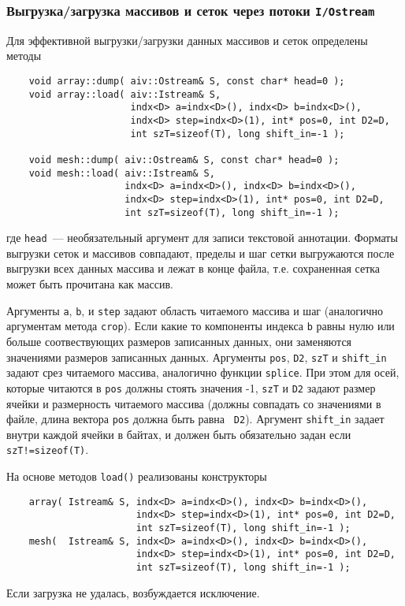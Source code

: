 \subsubsection{Выгрузка/загрузка массивов и сеток через потоки {\tt I/Ostream}}
Для эффективной выгрузки/загрузки данных массивов и сеток определены методы 
\begin{verbatim}
    void array::dump( aiv::Ostream& S, const char* head=0 );
    void array::load( aiv::Istream& S, 
                      indx<D> a=indx<D>(), indx<D> b=indx<D>(), 
                      indx<D> step=indx<D>(1), int* pos=0, int D2=D, 
                      int szT=sizeof(T), long shift_in=-1 );

    void mesh::dump( aiv::Ostream& S, const char* head=0 );
    void mesh::load( aiv::Istream& S, 
                     indx<D> a=indx<D>(), indx<D> b=indx<D>(), 
                     indx<D> step=indx<D>(1), int* pos=0, int D2=D,
                     int szT=sizeof(T), long shift_in=-1 );
\end{verbatim}
где {\tt head}~--- необязательный аргумент для записи текстовой
аннотации. Форматы выгрузки сеток и массивов совпадают, пределы и шаг сетки
выгружаются после выгрузки всех данных массива и лежат в конце файла,
т.е. сохраненная сетка может быть прочитана как массив. 

Аргументы {\tt a}, {\tt b}, и {\tt step} задают область читаемого массива и
шаг (аналогично аргументам метода {\tt crop}). 
Если какие то компоненты индекса {\tt b} равны нулю или
больше соотвествующих размеров записанных данных, они
заменяются значениями размеров записанных данных.
Аргументы {\tt pos}, {\tt D2},
{\tt szT} и {\tt shift\_in} задают срез читаемого массива, аналогично функции
{\tt splice}. При этом для осей,
которые читаются в {\tt pos} должны стоять значения -1, {\tt szT} и {\tt D2}
задают размер ячейки и размерность читаемого массива (должны совпадать со
значениями в файле, длина вектора {\tt pos} должна быть равна {\tt
  D2}). Аргумент {\tt shift\_in} задает внутри каждой ячейки в байтах, и
должен быть обязательно задан если {\tt szT!=sizeof(T)}. 

На основе методов {\tt load()} реализованы конструкторы 
\begin{verbatim}
    array( Istream& S, indx<D> a=indx<D>(), indx<D> b=indx<D>(), 
                       indx<D> step=indx<D>(1), int* pos=0, int D2=D, 
                       int szT=sizeof(T), long shift_in=-1 );
    mesh(  Istream& S, indx<D> a=indx<D>(), indx<D> b=indx<D>(), 
                       indx<D> step=indx<D>(1), int* pos=0, int D2=D, 
                       int szT=sizeof(T), long shift_in=-1 );
\end{verbatim}
Если загрузка не удалась, возбуждается исключение.


